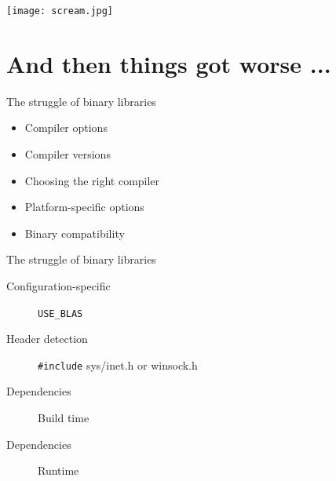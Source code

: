 \documentclass[pdf]{beamer}
\begin{document}
\begin{frame}
    \begin{center}
        \texttt{[image: scream.jpg]}
    \end{center}
\end{frame}

\section{And then things got worse ...}

\begin{frame}{The struggle of binary libraries}
    \begin{itemize}
        \item Compiler options
        \item Compiler versions
        \item Choosing the right compiler
        \item Platform-specific options
        \item Binary compatibility
    \end{itemize}
\end{frame}

\begin{frame}[fragile]{The struggle of binary libraries}
    \begin{description}
        \item [Configuration-specific] \verb|USE_BLAS|
        \item [Header detection] \verb|#include| sys/inet.h or winsock.h
        \item [Dependencies] Build time
        \item [Dependencies] Runtime
    \end{description}

\end{frame}
\end{document}
